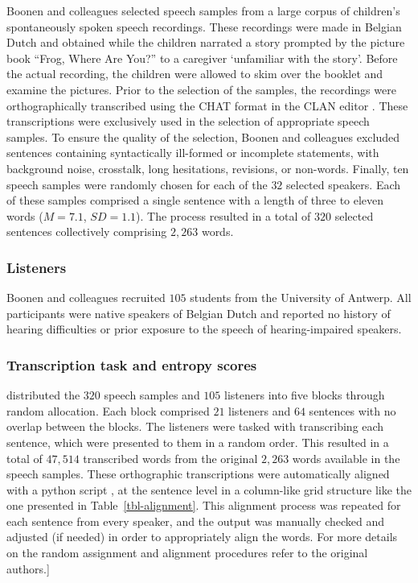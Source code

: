\documentclass[
  authoryear,
  preprint,
  1p]{elsarticle}
\begin{document}
Boonen and colleagues selected speech samples from a large corpus of
children's spontaneously spoken speech recordings. These recordings were
made in Belgian Dutch and obtained while the children narrated a story
prompted by the picture book ``Frog, Where Are You?'' \citep{Mayer_1969}
to a caregiver `unfamiliar with the story'. Before the actual recording,
the children were allowed to skim over the booklet and examine the
pictures. Prior to the selection of the samples, the recordings were
orthographically transcribed using the CHAT format in the CLAN editor
\citep{MacWhinney_2020}. These transcriptions were exclusively used in
the selection of appropriate speech samples. To ensure the quality of
the selection, Boonen and colleagues excluded sentences containing
syntactically ill-formed or incomplete statements, with background
noise, crosstalk, long hesitations, revisions, or non-words. Finally,
ten speech samples were randomly chosen for each of the \(32\) selected
speakers. Each of these samples comprised a single sentence with a
length of three to eleven words (\(M=7.1\), \(SD=1.1\)). The process
resulted in a total of \(320\) selected sentences collectively
comprising \(2,263\) words.

\subsubsection{Listeners}\label{sec-M-L}

Boonen and colleagues recruited \(105\) students from the University of
Antwerp. All participants were native speakers of Belgian Dutch and
reported no history of hearing difficulties or prior exposure to the
speech of hearing-impaired speakers.

\subsubsection{Transcription task and entropy scores}\label{sec-M-TS}

\citet{Boonen_et_al_2023} distributed the \(320\) speech samples and
\(105\) listeners into five blocks through random allocation. Each block
comprised \(21\) listeners and \(64\) sentences with no overlap between
the blocks. The listeners were tasked with transcribing each sentence,
which were presented to them in a random order. This resulted in a total
of \(47,514\) transcribed words from the original \(2,263\) words
available in the speech samples. These orthographic transcriptions were
automatically aligned with a python script \citep{Boonen_et_al_2023}, at
the sentence level in a column-like grid structure like the one
presented in Table~\ref{tbl-alignment}. This alignment process was
repeated for each sentence from every speaker, and the output was
manually checked and adjusted (if needed) in order to appropriately
align the words. For more details on the random assignment and alignment
procedures refer to the original authors.{]}
\end{document}
